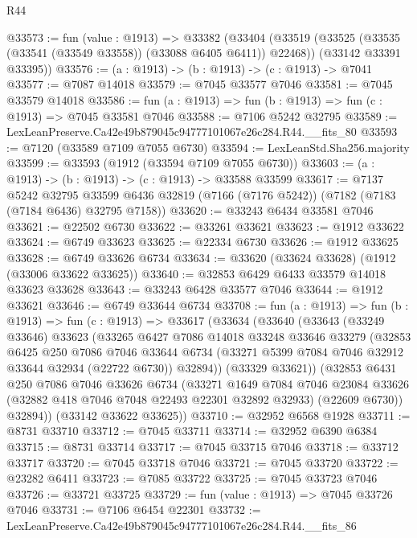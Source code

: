 \begin{lexlean}{R44}
\begin{coremodule}
{@33573 := fun (value : @1913) =>
  @33382
    (@33404
      (@33519 (@33525 (@33535 (@33541 (@33549 @33558)) (@33088 @6405 @6411)) @22468))
      (@33142 @33391 @33395))
@33576 := (a : @1913) -> (b : @1913) -> (c : @1913) -> @7041
@33577 := @7087 @14018
@33579 := @7045 @33577 @7046
@33581 := @7045 @33579 @14018
@33586 := fun (a : @1913) => fun (b : @1913) => fun (c : @1913) => @7045 @33581 @7046
@33588 := @7106 @5242 @32795
@33589 := LexLeanPreserve.Ca42e49b879045c94777101067e26c284.R44.__fits_80
@33593 := @7120 (@33589 @7109 @7055 @6730)
@33594 := LexLeanStd.Sha256.majority
@33599 := @33593 (@1912 (@33594 @7109 @7055 @6730))
@33603 := (a : @1913) -> (b : @1913) -> (c : @1913) -> @33588 @33599
@33617 := @7137
    @5242
    @32795
    @33599
    @6436
    @32819
    (@7166 (@7176 @5242))
    (@7182 (@7183 (@7184 @6436) @32795 @7158))
@33620 := @33243 @6434 @33581 @7046
@33621 := @22502 @6730
@33622 := @33261 @33621
@33623 := @1912 @33622
@33624 := @6749 @33623
@33625 := @22334 @6730
@33626 := @1912 @33625
@33628 := @6749 @33626 @6734
@33634 := @33620 (@33624 @33628) (@1912 (@33006 @33622 @33625))
@33640 := @32853 @6429 @6433 @33579 @14018 @33623 @33628
@33643 := @33243 @6428 @33577 @7046
@33644 := @1912 @33621
@33646 := @6749 @33644 @6734
@33708 := fun (a : @1913) =>
  fun (b : @1913) =>
  fun (c : @1913) =>
  @33617
    (@33634
      (@33640
        (@33643
          (@33249 @33646)
          @33623
          (@33265
            @6427
            @7086
            @14018
            @33248
            @33646
            @33279
            (@32853
              @6425
              @250
              @7086
              @7046
              @33644
              @6734
              (@33271 @5399 @7084 @7046 @32912 @33644 @32934 (@22722 @6730))
              @32894))
          (@33329 @33621))
        (@32853
          @6431
          @250
          @7086
          @7046
          @33626
          @6734
          (@33271
            @1649
            @7084
            @7046
            @23084
            @33626
            (@32882 @418 @7046 @7048 @22493 @22301 @32892 @32933)
            (@22609 @6730))
          @32894))
      (@33142 @33622 @33625))
@33710 := @32952 @6568 @1928
@33711 := @8731 @33710
@33712 := @7045 @33711
@33714 := @32952 @6390 @6384
@33715 := @8731 @33714
@33717 := @7045 @33715 @7046
@33718 := @33712 @33717
@33720 := @7045 @33718 @7046
@33721 := @7045 @33720
@33722 := @23282 @6411
@33723 := @7085 @33722
@33725 := @7045 @33723 @7046
@33726 := @33721 @33725
@33729 := fun (value : @1913) => @7045 @33726 @7046
@33731 := @7106 @6454 @22301
@33732 := LexLeanPreserve.Ca42e49b879045c94777101067e26c284.R44.__fits_86
}
\end{coremodule}
\end{lexlean}
